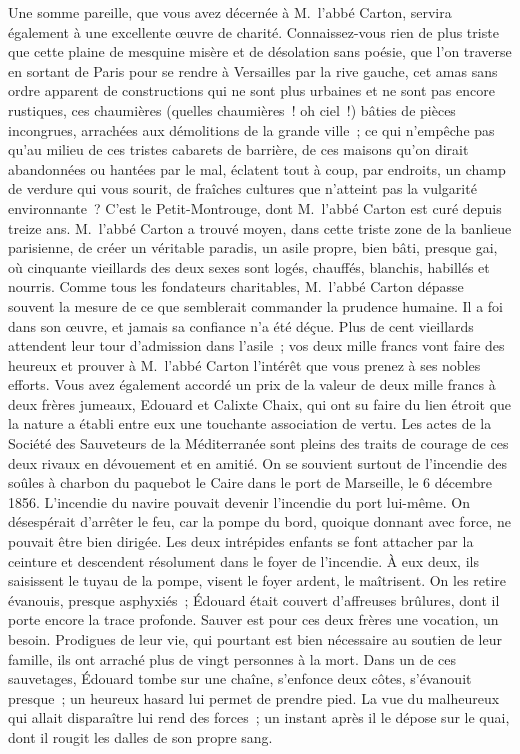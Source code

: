 \documentclass[french,twoside]{book} %
\newcommand\orgName[1]{#1}
\newcommand\persName[1]{#1}
\newcommand\placeName[1]{#1}
\begin{document}
Une somme pareille, que vous avez décernée à {\persName M. l’abbé Carton}, servira également à une excellente œuvre de charité. Connaissez-vous rien de plus triste que cette plaine de mesquine misère et de désolation sans poésie, que l’on traverse en sortant de Paris pour se rendre à {\placeName Versailles} par la rive gauche, cet amas sans ordre apparent de constructions qui ne sont plus urbaines et ne sont pas encore rustiques, ces chaumières (quelles chaumières ! oh ciel !) bâties de pièces incongrues, arrachées aux démolitions de la grande ville ; ce qui n’empêche pas qu’au milieu de ces tristes cabarets de barrière, de ces maisons qu’on dirait abandonnées ou hantées par le mal, éclatent tout à coup, par endroits, un champ de verdure qui vous sourit, de fraîches cultures que n’atteint pas la vulgarité environnante ? C’est le {\orgName Petit-Montrouge}, dont {\persName M. l’abbé Carton} est curé depuis treize ans. {\persName M. l’abbé Carton} a trouvé moyen, dans cette triste zone de la banlieue parisienne, de créer un véritable paradis, un asile propre, bien bâti, presque gai, où cinquante vieillards des deux sexes sont logés, chauffés, blanchis, habillés et nourris. Comme tous les fondateurs charitables, {\persName M. l’abbé Carton} dépasse souvent la mesure de ce que semblerait commander la prudence humaine. Il a foi dans son œuvre, et jamais sa confiance n’a été déçue. Plus de cent vieillards attendent leur tour d’admission dans l’asile ; vos deux mille francs vont faire des heureux et prouver à {\persName M. l’abbé Carton} l’intérêt que vous prenez à ses nobles efforts. Vous avez également accordé un prix de la valeur de deux mille francs à deux frères jumeaux, {\orgName Edouard et Calixte Chaix}, qui ont su faire du lien étroit que la nature a établi entre eux une touchante association de vertu. Les actes de la {\orgName Société des Sauveteurs de la Méditerranée} sont pleins des traits de courage de ces deux rivaux en dévouement et en amitié. On se souvient surtout de l’incendie des soûles à charbon du paquebot le {\placeName Caire} dans le port de {\placeName Marseille}, le 6 décembre 1856. L’incendie du navire pouvait devenir l’incendie du port lui-même. On désespérait d’arrêter le feu, car la pompe du bord, quoique donnant avec force, ne pouvait être bien dirigée. Les deux intrépides enfants se font attacher par la ceinture et descendent résolument dans le foyer de l’incendie. À eux deux, ils saisissent le tuyau de la pompe, visent le foyer ardent, le maîtrisent. On les retire évanouis, presque asphyxiés ; {\persName Édouard} était couvert d’affreuses brûlures, dont il porte encore la trace profonde. Sauver est pour ces deux frères une vocation, un besoin. Prodigues de leur vie, qui pourtant est bien nécessaire au soutien de leur famille, ils ont arraché plus de vingt personnes à la mort. Dans un de ces sauvetages, Édouard tombe sur une chaîne, s’enfonce deux côtes, s’évanouit presque ; un heureux hasard lui permet de prendre pied. La vue du malheureux qui allait disparaître lui rend des forces ; un instant après il le dépose sur le quai, dont il rougit les dalles de son propre sang.\par
\end{document}
